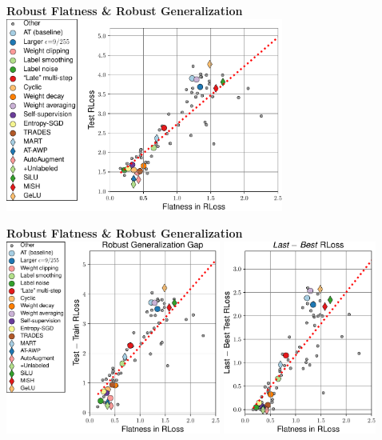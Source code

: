 \documentclass[64pt,aspectratio=169]{beamer}
\begin{document}
	\begin{frame}{\bfseries Robust Flatness \& Robust Generalization}
		\Large
		\centering
		\vspace*{-0.25cm}
		\includegraphics[height=6.35cm]{plots/talk_flatness_correlation_seq_loss2.pdf}
	\end{frame}
	
	\begin{frame}{\bfseries Robust Flatness \& Robust Generalization}
		\Large
		\centering
		\vspace*{-0.25cm}
		\includegraphics[height=6.35cm]{plots/talk_flatness_seq_test_train.pdf}
		\includegraphics[height=6.35cm]{plots/talk_flatness_correlation_seq_last_best_loss.pdf}
	\end{frame}
	
\end{document}
